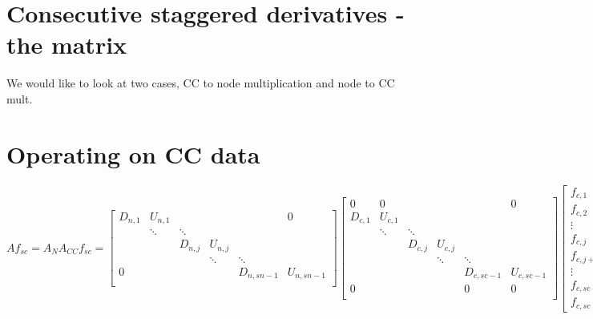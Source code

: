 \documentclass[landscape]{article}
\begin{document}
\doublespacing
\MOONSTITLE

\section{Consecutive staggered derivatives - the matrix}

We would like to look at two cases, CC to node multiplication and node to CC mult.

\section{Operating on CC data}

\[
Af_{sc} = A_{N}A_{CC}f_{sc} =
\left[
\begin{array}{ccccccccc}
D_{n,1} & U_{n,1} &  &   &   & 0 \\
  & \ddots & \ddots &   &   \\
  &   & D_{n,j} & U_{n,j} &   \\
  &   &  & \ddots & \ddots &   \\
 0&   &   &   & D_{n,sn-1} & U_{n,sn-1} \\
\end{array}
\right]
\left[
\begin{array}{ccccccccc}
  0&  0&   &   &   &   0 \\
D_{c,1} & U_{c,1} &  &   &   & \\
  & \ddots & \ddots &   &   \\
  &   & D_{c,j} & U_{c,j} &   \\
  &   &  & \ddots & \ddots &   \\
  &   &   &   & D_{c,sc-1} & U_{c,sc-1} \\
 0&  &   &   &   0 &  0 \\
\end{array}
\right]
\left[
\begin{array}{ccccccccc}
  f_{c,1} \\ f_{c,2} \\ \vdots \\ f_{c,j} \\ f_{c,j+1} \\ \vdots \\ f_{c,sc-1} \\ f_{c,sc}
\end{array}
\right]
=
\]
\end{document}
